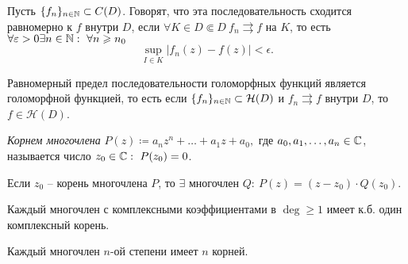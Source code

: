 \begin{definition}
	Пусть $\{f_n\}_{n \in \mathbb{N}} \subset C(D)$. Говорят, что эта последовательность сходится равномерно к $f$ внутри $D$, если $\forall K \in D \Subset D \ f_n \rightrightarrows f$ на $K$, то есть $\forall \varepsilon > 0 \exists n \in \mathbb{N}: \ \forall n \geqslant n_0$
	\[
		\underset{I \in K}{\sup} \big|f_n(z)- f(z)\big| < \epsilon .
	\]
\end{definition}

\begin{theorem}[Вейерштрасса]
	Равномерный предел последовательности голоморфных функций является голоморфной функцией, то есть если $\{f_n\}_{n \in \mathbb{N}} \subset \mathcal{H}(D)$ и $f_n \rightrightarrows f$ внутри $D$, то $f \in \mathcal{H}(D)$.
\end{theorem}

\begin{definition}
	\emph{Корнем многочлена} $P(z)\coloneq a_n z^n + \ldots + a_1z + a_0,$ где $a_0,a_1,\ldots ,a_n \in \mathbb{C}$, называется число $z_0 \in \mathbb{C}: \ P(z_0) = 0$.
\end{definition}

\begin{theorem}[Безу]
	Если $z_0$ -- корень многочлена $P$, то $\exists $ многочлен $Q: \ P(z) = (z-z_0)\cdot Q(z_0)$.
\end{theorem}

\begin{theorem}
	Каждый многочлен с комплексными коэффициентами в $\deg \geqslant 1$ имеет к.б. один комплексный корень.
\end{theorem}

\begin{corollary}
	Каждый многочлен $n$-ой степени имеет $n$ корней.
\end{corollary}
